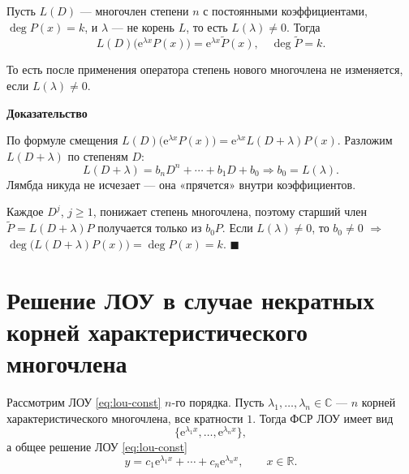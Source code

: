 \documentclass[12pt,a4paper]{article}
\numberwithin{equation}{section}
\newcommand{\R}{\mathbb{R}}
\newcommand{\e}{\mathrm{e}}
\renewenvironment{proof}[1][Доказательство]{\begin{center}\textbf{#1}\end{center}}{\hfill$\blacksquare$\par}
\begin{document}
\begin{theoremHSE}
Пусть \(L(D)\) --- многочлен степени \(n\) с постоянными коэффициентами, \(\deg P(x)=k\), и \(\lambda\) --- не корень \(L\), то есть \(L(\lambda)\neq0\). Тогда
\[
L(D)\bigl(\e^{\lambda x}P(x)\bigr)=\e^{\lambda x}\tilde P(x),\quad\deg\tilde P=k.
\]
\end{theoremHSE}
То есть после применения оператора степень нового многочлена не изменяется, если \(L(\lambda)\neq0\).

\begin{proof}
По формуле смещения \(L(D)\bigl(\e^{\lambda x}P(x)\bigr)=\e^{\lambda x}L(D+\lambda)P(x)\). Разложим \(L(D+\lambda)\) по степеням \(D\):
\[
L(D+\lambda)=b_nD^n+\cdots+b_1D+b_0\Rightarrow b_0=L(\lambda).
\]
Лямбда никуда не исчезает --- она «прячется» внутри коэффициентов.

Каждое \(D^j\), \(j\ge1\), понижает степень многочлена, поэтому старший член \(\tilde P=L(D+\lambda)P\) получается только из \(b_0P\). Если \(L(\lambda)\neq0\), то \(b_0\neq0\) \(\Rightarrow\) \(\deg\bigl(L(D+\lambda)P(x)\bigr)=\deg P(x)=k\).
\end{proof}

\section[Различные корни]{Решение ЛОУ в случае некратных корней характеристического многочлена}
\label{sec:roots-simple}

\begin{theoremHSE}
Рассмотрим ЛОУ \eqref{eq:lou-const} \(n\)-го порядка. Пусть \(\lambda_1,\ldots,\lambda_n\in\mathbb C\) --- \(n\) корней характеристического многочлена, все кратности \(1\). Тогда ФСР ЛОУ имеет вид
\begin{equation}
\bigl\{\e^{\lambda_1x},\ldots,\e^{\lambda_nx}\bigr\},
\label{eq:fsr-simple}
\end{equation}
а общее решение ЛОУ \eqref{eq:lou-const}
\begin{equation}
y=c_1\e^{\lambda_1x}+\cdots+c_n\e^{\lambda_nx},\qquad x\in\R.
\label{eq:gen-simple}
\end{equation}
\end{theoremHSE}
\end{document}
